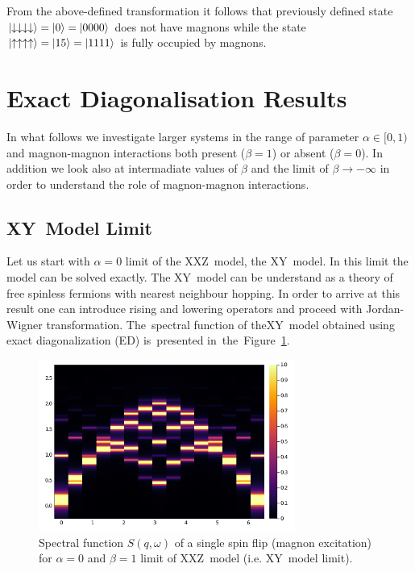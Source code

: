 \documentclass[12pt, a4paper]{article}
\begin{document}
From the above-defined transformation it follows that previously defined state $\ket{\downarrow\downarrow\downarrow\downarrow} = \ket{0} = \ket{0 0 0 0}$ does not have magnons while the state $\ket{\uparrow\uparrow\uparrow\uparrow} = \ket{15} = \ket{1 1 1 1}$ is fully occupied by magnons.

\section{Exact Diagonalisation Results}\label{sec:ed_results}
In what follows we investigate larger systems in the range of parameter $\alpha \in [0, 1)$ and magnon-magnon interactions both present ($\beta = 1$) or absent ($\beta = 0$). In addition we look also at intermadiate values of $\beta$ and the limit of $\beta \to -\infty$ in order to understand the role of magnon-magnon interactions.

\subsection{XY~Model Limit}\label{sec:XY_model}
Let us start with $\alpha = 0$ limit of the XXZ~model, the XY~model. In this limit the model can be solved exactly. The XY~model can be understand as a theory of free spinless fermions with nearest neighbour hopping. In order to arrive at this result one can introduce rising and lowering operators and proceed with Jordan-Wigner transformation. The~spectral function of theXY~model obtained using exact diagonalization (ED) is~presented in~the~Figure~\ref{fig:XY_int}.
\begin{figure}[ht]
	\centering
	\includegraphics[width=0.75\textwidth]{../figures/fig001.png}
	\caption{Spectral function $S(q,\omega)$ of a single spin flip (magnon excitation) for $\alpha = 0$ and $\beta = 1$ limit of XXZ~model (i.e. XY~model limit).}\label{fig:XY_int}
\end{figure}
\end{document}
